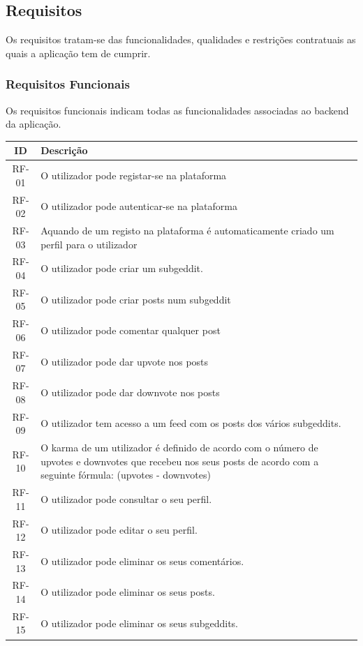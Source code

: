 \documentclass{article}
\begin{document}
	\subsection{Requisitos}
	Os requisitos tratam-se das funcionalidades, qualidades e restrições contratuais as quais a aplicação tem de cumprir.
	\subsubsection{Requisitos Funcionais}
		Os requisitos funcionais indicam todas as funcionalidades associadas ao backend da aplicação.
		\begin{table}[H]
			\centering
			\begin{tabular}{|c|p{14cm}|}
				\hline
				ID & Descrição \\
				\hline
				RF-01 & O utilizador pode registar-se na plataforma \\
				\hline
				RF-02 & O utilizador pode autenticar-se na plataforma \\
				\hline
				RF-03 & Aquando de um registo na plataforma é automaticamente criado um perfil para o utilizador \\
				\hline
				RF-04 & O utilizador pode criar um subgeddit. \\
				\hline
				RF-05 & O utilizador pode criar posts num subgeddit \\
				\hline
				RF-06 & O utilizador pode comentar qualquer post \\
				\hline
				RF-07 & O utilizador pode dar upvote nos posts \\
				\hline
				RF-08 & O utilizador pode dar downvote nos posts \\
				\hline
				RF-09 & O utilizador tem acesso a um feed com os posts dos vários subgeddits. \\
				\hline
				RF-10 & O karma de um utilizador é definido de acordo com o número de upvotes e downvotes que recebeu nos seus posts de acordo com a seguinte fórmula: (upvotes - downvotes) \\
				\hline
				RF-11 & O utilizador pode consultar o seu perfil. \\
				\hline
				RF-12 & O utilizador pode editar o seu perfil. \\
				\hline
				RF-13 & O utilizador pode eliminar os seus comentários. \\
				\hline
				RF-14 & O utilizador pode eliminar os seus posts. \\
				\hline
				RF-15 & O utilizador pode eliminar os seus subgeddits. \\

\end{tabular}
\end{table}
\end{document}
